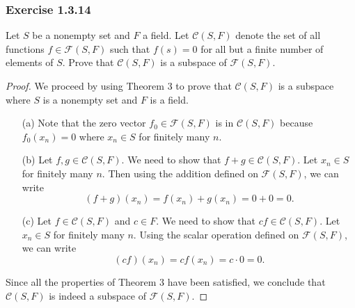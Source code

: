\subsubsection{Exercise 1.3.14} Let \( S  \) be a nonempty set and \( F  \) a field. Let \( \mathcal{C}(S,F) \) denote the set of all functions \( f \in \mathcal{F}(S,F) \) such that \( f(s) = 0  \) for all but a finite number of elements of \( S  \). Prove that \( \mathcal{C}(S,F) \) is a subspace of \( \mathcal{F}(S,F) \).
\begin{proof}
    We proceed by using Theorem 3 to prove that \(  \mathcal{C}(S,F) \) is a subspace where \( S  \) is a nonempty set and \( F  \) is a field.  
    \begin{enumerate}
        \item[(a)] Note that the zero vector \( f_{0} \in \mathcal{F}(S,F) \) is in \( \mathcal{C}(S,F) \) because \( f_{0}(x_{n}) = 0  \) where \( x_{n} \in S  \) for finitely many \( n  \).
        \item[(b)] Let \( f,g \in \mathcal{C}(S,F) \). We need to show that \( f+g \in \mathcal{C}(S,F) \). Let \( x_{n} \in S   \) for finitely many \( n  \). Then using the addition defined on \( \mathcal{F}(S,F) \), we can write
            \[  (f+g)(x_{n}) = f(x_{n}) + g(x_{n}) = 0 + 0 = 0. \]
        \item[(c)] Let \( f \in \mathcal{C}(S,F)  \) and \( c \in F  \). We need to show that \( cf \in \mathcal{C}(S,F) \). Let \( x_{n} \in S  \) for finitely many \( n  \). Using the scalar operation defined on \( \mathcal{F}(S,F) \), we can write 
            \[  (cf)(x_{n}) = c f(x_{n}) = c \cdot 0 = 0. \]
    \end{enumerate}
    Since all the properties of Theorem 3 have been satisfied, we conclude that \( \mathcal{C}(S,F) \) is indeed a subspace of \( \mathcal{F}(S,F) \).
\end{proof}

